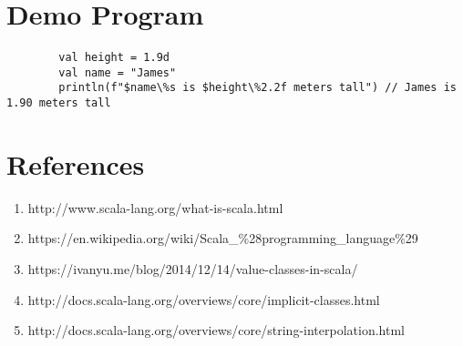 \documentclass[12pt]{article}
\begin{document}
\section{Demo Program}
	\paragraph{}

	\begin{lstlisting}
		val height = 1.9d
		val name = "James"
		println(f"$name\%s is $height\%2.2f meters tall") // James is 1.90 meters tall
	\end{lstlisting}
\section{References}
	\begin{enumerate}
		\item
			http://www.scala-lang.org/what-is-scala.html
		\item
			https://en.wikipedia.org/wiki/Scala\_\%28programming\_language\%29
		\item
			https://ivanyu.me/blog/2014/12/14/value-classes-in-scala/
		\item 
			http://docs.scala-lang.org/overviews/core/implicit-classes.html
		\item
			http://docs.scala-lang.org/overviews/core/string-interpolation.html
	\end{enumerate}
\end{document}
